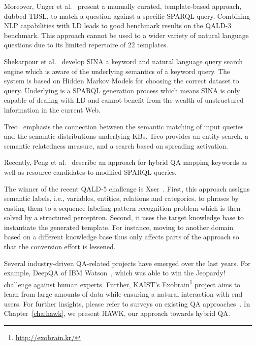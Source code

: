 Moreover, Unger et al.~\cite{template} present a manually curated, template-based approach, dubbed {TBSL}, to match a question against a specific SPARQL query. 
Combining \ac{NLP} capabilities with \ac{LD} leads to good benchmark results on the \ac{QALD}-3 benchmark.
This approach cannot be used to a wider variety of natural language questions due to its limited repertoire of 22 templates.

{Shekarpour et al.~\cite{SINA_WebSemantic}} develop {SINA} a keyword and natural language query search engine which is aware of the underlying semantics of a keyword query. 
The system is based on Hidden Markov Models for choosing the correct dataset to query.
Underlying is a SPARQL generation process which means SINA is only capable of dealing with \ac{LD} and cannot benefit from the wealth of unstructured information in the current Web.


{Treo}~\cite{treo} emphasis the connection between the semantic matching of input queries and the semantic distributions underlying \ac{KB}s.
Treo provides an entity search, a semantic relatedness measure, and a search based on spreading activation.

Recently, Peng et al.~\cite{DBLP:journals/corr/PengZZ14} describe an approach for hybrid \ac{QA} mapping keywords as well as resource candidates to modified SPARQL queries. 

The winner of the recent \ac{QALD}-5 challenge is Xser~\cite{xu2014xser}.
First, this approach assigns semantic labels, i.e., variables, entities, relations and categories, to phrases by casting them to a sequence labeling pattern recognition problem which is then solved by a structured perceptron.
Second, it uses the target knowledge base to instantiate the generated template.
For instance, moving to another domain based on a different knowledge base thus only affects parts of the approach so that the conversion effort is lessened.


Several industry-driven \ac{QA}-related projects have emerged over the last years. 
For example, DeepQA of IBM Watson~\cite{watson}, which was able to win the Jeopardy! challenge against human experts. 
Further, {KAIST's Exobrain\footnote{\url{http://exobrain.kr/}}} project aims to learn from large amounts of data while ensuring a natural interaction with end users. 
For further insights, please refer to surveys on existing \ac{QA} approaches~\cite{qasurvey,Kolomiyets:2011,DBLP:journals/semweb/LopezUSM11}.
In Chapter~\ref{cha:hawk}, we present HAWK, our approach towards hybrid \ac{QA}. 



